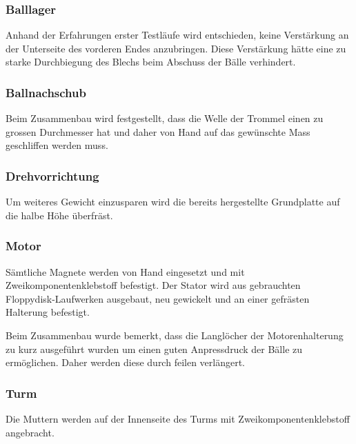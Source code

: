 \subsubsection{Balllager}
Anhand der Erfahrungen erster Testläufe wird entschieden, keine Verstärkung an der Unterseite des vorderen Endes anzubringen. Diese Verstärkung hätte eine zu starke Durchbiegung des Blechs beim Abschuss der Bälle verhindert.
\subsubsection{Ballnachschub}
Beim Zusammenbau wird festgestellt, dass die Welle der Trommel einen zu grossen Durchmesser hat und daher von Hand auf das gewünschte Mass geschliffen werden muss.
\subsubsection{Drehvorrichtung}
Um weiteres Gewicht einzusparen wird die bereits hergestellte Grundplatte auf die halbe Höhe überfräst.
\subsubsection{Motor}
Sämtliche Magnete werden von Hand eingesetzt und mit Zweikomponentenklebstoff befestigt. Der Stator wird aus gebrauchten Floppydisk-Laufwerken ausgebaut, neu gewickelt und an einer gefrästen Halterung befestigt.

Beim Zusammenbau wurde bemerkt, dass die Langlöcher der Motorenhalterung zu kurz ausgeführt wurden um einen guten Anpressdruck der Bälle zu ermöglichen. Daher werden diese durch feilen verlängert.
\subsubsection{Turm}
Die Muttern werden auf der Innenseite des Turms mit Zweikomponentenklebstoff angebracht.